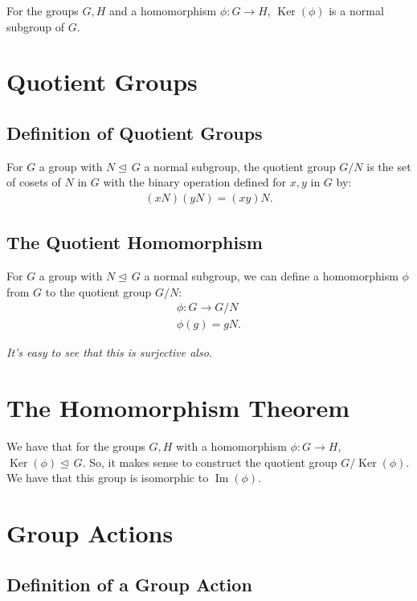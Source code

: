 \documentclass[a4paper, 12pt, twoside]{article}
\DeclareMathOperator{\Ker}{Ker}
\DeclareMathOperator{\Ima}{Im}
\begin{document}
For the groups $G, H$ and a homomorphism $\phi : G \to H$,
$\Ker(\phi)$ is a normal subgroup of $G$.

\section{Quotient Groups}

\subsection{Definition of Quotient Groups}

For $G$ a group with $N \unlhd \, G$ a normal subgroup, the quotient
group $G/N$ is the set of cosets of $N$ in $G$ with the binary
operation defined for $x, y$ in $G$ by:
\begin{align*}
      (xN)(yN) = (xy)N.
\end{align*}

\subsection{The Quotient Homomorphism}

For $G$ a group with $N \unlhd \, G$ a normal subgroup, we can 
define a homomorphism $\phi$ from $G$ to the quotient group $G/N$:
\begin{gather*}
      \phi: G \to G/N \\
      \phi(g) = gN.
\end{gather*}

\textit{It's easy to see that this is surjective also.}

\newpage

\section{The Homomorphism Theorem}

We have that for the groups $G, H$ with a homomorphism 
$\phi : G \to H$, $\Ker(\phi) \unlhd \, G$. So, it makes sense to
construct the quotient group $G/\Ker(\phi)$. We have that this
group is isomorphic to $\Ima(\phi)$.

\section{Group Actions}

\subsection{Definition of a Group Action}
\end{document}
